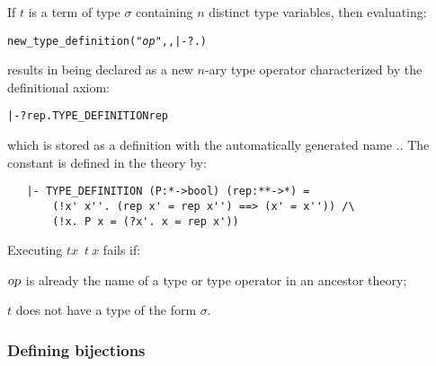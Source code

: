 \noindent If $t$ is a term of type
$\sigma$ containing $n$ distinct type variables, then
evaluating:

{\def\op{{\normalsize\sl op}}
\begin{hol}\begin{alltt}
   new_type_definition("{\op}", , |- ?.)
\end{alltt}\end{hol}}

\noindent results in  being declared as a new $n$-ary type operator
characterized by the definitional axiom:

\begin{hol}\begin{alltt}
   |- ?rep. TYPE\_DEFINITION  rep
\end{alltt}\end{hol}

\noindent which is stored as a definition with the automatically
generated name
.. The constant
is defined in the theory  by:

\begin{hol}\begin{verbatim}
   |- TYPE_DEFINITION (P:*->bool) (rep:**->*) =
       (!x' x''. (rep x' = rep x'') ==> (x' = x'')) /\
       (!x. P x = (?x'. x = rep x'))
\end{verbatim}\end{hol}

\noindent Executing $t$$x$\ $t\ x$\ml{)} fails if:
\begin{myenumerate}
\item $\textsl{op}$ is already the name of a type or type operator
in an ancestor theory;
\item $t$ does not have a type of the form $\sigma$\ml{->bool}.
\end{myenumerate}

\subsubsection{Defining bijections}

